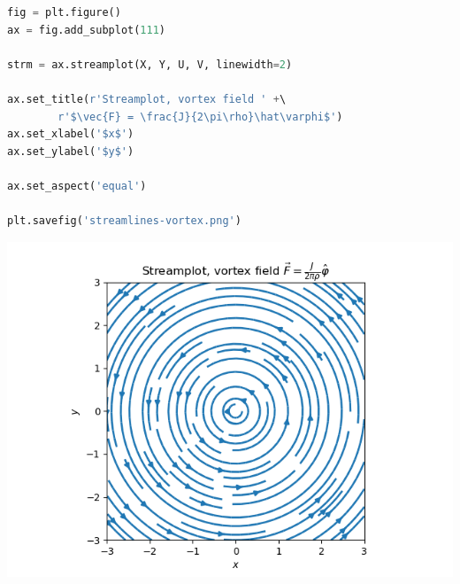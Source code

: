 \documentclass[%
oneside,                 %
final,                   %
10pt]{article}
\newenvironment{notice_mdfboxadmon}[1][]{
\begin{notice_mdfboxmdframed}[frametitle=#1]
}
{
\end{notice_mdfboxmdframed}
}
\begin{document}
\begin{notice_mdfboxadmon}
\begin{lstlisting}[language=Python,style=blue1]
fig = plt.figure()
ax = fig.add_subplot(111)

strm = ax.streamplot(X, Y, U, V, linewidth=2)

ax.set_title(r'Streamplot, vortex field ' +\ 
        r'$\vec{F} = \frac{J}{2\pi\rho}\hat\varphi$')
ax.set_xlabel('$x$')
ax.set_ylabel('$y$')

ax.set_aspect('equal')

plt.savefig('streamlines-vortex.png')
\end{lstlisting}



\vspace{6mm}

\centerline{\includegraphics[width=0.8\linewidth]{fig/streamlines-vortex.png}}

\vspace{6mm}
\end{notice_mdfboxadmon} %




\end{document}
